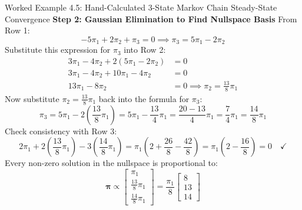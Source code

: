 \begin{examplebox}{Worked Example 4.5: Hand-Calculated 3-State Markov Chain Steady-State Convergence}
\textbf{Step 2: Gaussian Elimination to Find Nullspace Basis}
From Row 1:
\begin{equation*}
-5\pi_1 + 2\pi_2 + \pi_3 = 0 \implies \pi_3 = 5\pi_1 - 2\pi_2
\end{equation*}
Substitute this expression for $\pi_3$ into Row 2:
\begin{align*}
3\pi_1 - 4\pi_2 + 2(5\pi_1 - 2\pi_2) &= 0 \\
3\pi_1 - 4\pi_2 + 10\pi_1 - 4\pi_2 &= 0 \\
13\pi_1 - 8\pi_2 &= 0 \implies \pi_2 = \frac{13}{8} \pi_1
\end{align*}
Now substitute $\pi_2 = \frac{13}{8}\pi_1$ back into the formula for $\pi_3$:
\begin{equation*}
\pi_3 = 5\pi_1 - 2\left(\frac{13}{8}\pi_1\right) = 5\pi_1 - \frac{13}{4}\pi_1 = \frac{20 - 13}{4}\pi_1 = \frac{7}{4}\pi_1 = \frac{14}{8}\pi_1
\end{equation*}
Check consistency with Row 3:
\begin{equation*}
2\pi_1 + 2\left(\frac{13}{8}\pi_1\right) - 3\left(\frac{14}{8}\pi_1\right) = \pi_1 \left( 2 + \frac{26}{8} - \frac{42}{8} \right) = \pi_1 \left( 2 - \frac{16}{8} \right) = 0 \quad \checkmark
\end{equation*}
Every non-zero solution in the nullspace is proportional to:
\begin{equation*}
\boldsymbol{\pi} \propto \begin{bmatrix} \pi_1 \\ \frac{13}{8}\pi_1 \\ \frac{14}{8}\pi_1 \end{bmatrix} = \frac{\pi_1}{8} \begin{bmatrix} 8 \\ 13 \\ 14 \end{bmatrix}
\end{equation*}


\end{examplebox}
